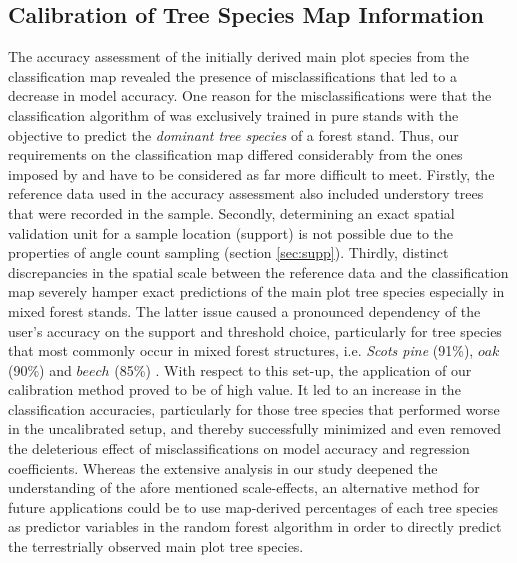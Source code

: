 \subsection{Calibration of Tree Species Map Information}
\label{sec:calib_dis}
The accuracy assessment of the initially derived main plot species from the classification map revealed the presence of misclassifications that led to a decrease in model accuracy.  One reason for the misclassifications were that the classification algorithm of \citet{stoffels2015} was exclusively trained in pure stands with the objective to predict the \textit{dominant tree species} of a forest stand. Thus, our requirements on the classification map differed considerably from the ones imposed by \citet{stoffels2015} and have to be considered as far more difficult to meet. Firstly, the reference data used in the accuracy assessment also included understory trees that were recorded in the \bwi{} sample. Secondly, determining an exact spatial validation unit for a sample location (support) is not possible due to the properties of angle count sampling (section \ref{sec:supp}). Thirdly, distinct discrepancies in the spatial scale between the reference data and the classification map severely hamper exact predictions of the main plot tree species especially in mixed forest stands. The latter issue caused a pronounced dependency of the user's accuracy on the support and threshold choice, particularly for tree species that most commonly occur in mixed forest structures, i.e. \textit{Scots pine} (91\%), $oak$ (90\%) and $beech$ (85\%) \citep{bwi3}. With respect to this set-up, the application of our calibration method proved to be of high value. It led to an increase in the classification accuracies, particularly for those tree species that performed worse in the uncalibrated setup, and thereby successfully minimized and even removed the deleterious effect of misclassifications on model accuracy and regression coefficients. Whereas the extensive analysis in our study deepened the understanding of the afore mentioned scale-effects, an alternative method for future applications could be to use map-derived percentages of each tree species as predictor variables in the random forest algorithm in order to directly predict the terrestrially observed main plot tree species.


